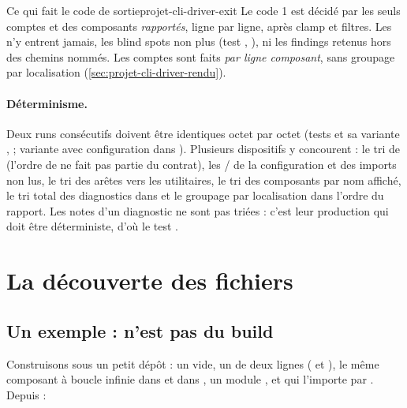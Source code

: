 
\begin{invariant}{Ce qui fait le code de sortie}{projet-cli-driver-exit}
Le code 1 est décidé par les seuls comptes  et  des composants \emph{rapportés}, ligne par ligne, après clamp et filtres. Les \Info{} n'y entrent jamais, les blind spots non plus (test , ), ni les findings retenus hors des chemins nommés. Les comptes sont faits \emph{par ligne composant}, sans groupage par localisation (\cref{sec:projet-cli-driver-rendu}).
\end{invariant}

\paragraph{Déterminisme.} Deux runs consécutifs doivent être identiques octet par octet (tests  et sa variante ,  ; variante avec configuration dans ). Plusieurs dispositifs y concourent : le tri de  (l'ordre de  ne fait pas partie du contrat), les / de la configuration et des imports non lus, le tri des arêtes vers les utilitaires, le tri des composants par nom affiché, le tri total des diagnostics dans  et le groupage par localisation dans l'ordre du rapport. Les notes d'un diagnostic ne sont pas triées : c'est leur production qui doit être déterministe, d'où le test .

\section{La découverte des fichiers}
\label{sec:projet-cli-driver-decouverte}

\subsection{Un exemple :  n'est pas du build}

Construisons sous  un petit dépôt : un  vide, un  de deux lignes ( et ), le même composant  à boucle infinie dans  et dans , un module , et  qui l'importe par . Depuis  :

